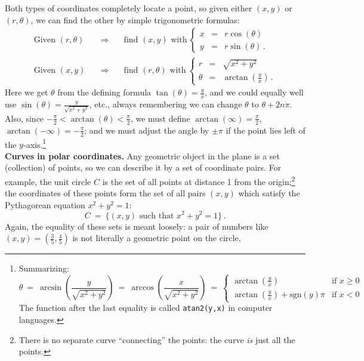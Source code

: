 \documentclass[11pt]{article}
\begin{document}
Both types of coordinates completely locate a point, 
so given either $(x,y)$ or $(r,\theta)$,
we can find the other by simple trigonometric formulas:
$$\begin{array}{lcl}
\text{Given $(r,\theta)$}
&\quad\Longrightarrow\quad&
\text{find $(x,y)$ with}\ 
\left\{\begin{array}{rcl}
x &=& r\cos(\theta)
\\[.3em]
y &=& r\sin(\theta)\,.
\end{array}\right.
\\[2em]
\text{Given $(x,y)$}
&\quad\Longrightarrow\quad&
\text{find $(r,\theta)$ with}\ 
\left\{\begin{array}{rcl}
r &=& \sqrt{x^2+y^2}
\\[.3em]
\theta &=& \arctan(\tfrac yx)\,.
\end{array}\right.
\end{array}$$
Here we get $\theta$ from the defining formula $\tan(\theta)=\frac yx$,
and we could equally well use $\sin(\theta) =\frac{y}{\sqrt{x^2{+}y^2}}$, etc.,
always remembering we can change $\theta$ to
$\theta{+}2n\pi$.
Also, since $-\frac\pi2<\arctan(\theta)<\frac\pi2$,
we must define $\arctan(\infty)=\frac\pi2$, 
$\arctan(-\infty)=-\frac\pi2$;
and we must adjust the angle by $\pm\pi$ if the point lies left of the $y$-axis.\footnote{
Summarizing:
$$
\theta 
\ =\ 
\arcsin\!\left(\!\frac{y}{\sqrt{x^2{+}y^2}}\!\right)
\ =\ 
\arccos\!\left(\!\frac{x}{\sqrt{x^2{+}y^2}}\!\right)
\ =\ 
\left\{\!\!\begin{array}{cl}
\arctan\left(\frac yx\right) &\text{if $x\geq 0$}\\[.5em]
\arctan\left(\frac yx\right) +\mathrm{sgn}(y)\pi &\text{if $x< 0$}
\end{array}\right.
$$
The function after the last equality is called {\tt atan2(y,x)} in computer languages.
}
\\[1em]
{\bf Curves in polar coordinates.}
Any geometric object in the plane is a set (collection) of points, 
so we can describe it by a set of coordinate pairs.
For example,  the unit circle $C$ is the set of all points at distance 1 from the origin;\footnote{ 
There is no separate curve ``connecting'' the points: the curve {\it is} just all the points.}
the coordinates of these points form the set of all pairs $(x,y)$ which satisfy the Pythagorean equation $x^2 + y^2=1$:
$$
C \ = \ \{(x,y)\text{ such that } x^2+y^2=1\}\,.
$$
Again, the equality of these sets is meant loosely: a pair of numbers
like $(x,y)=(\frac35,\frac45)$ is not literally a geometric point  on the circle, 
\end{document}
